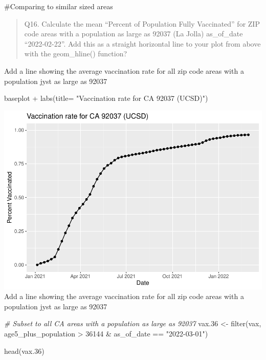 \documentclass[
]{article}
\newenvironment{Shaded}{\begin{snugshade}}{\end{snugshade}}
\newcommand{\AttributeTok}[1]{\textcolor[rgb]{0.77,0.63,0.00}{#1}}
\newcommand{\CommentTok}[1]{\textcolor[rgb]{0.56,0.35,0.01}{\textit{#1}}}
\newcommand{\DecValTok}[1]{\textcolor[rgb]{0.00,0.00,0.81}{#1}}
\newcommand{\FloatTok}[1]{\textcolor[rgb]{0.00,0.00,0.81}{#1}}
\newcommand{\FunctionTok}[1]{\textcolor[rgb]{0.00,0.00,0.00}{#1}}
\newcommand{\NormalTok}[1]{#1}
\newcommand{\OtherTok}[1]{\textcolor[rgb]{0.56,0.35,0.01}{#1}}
\newcommand{\SpecialCharTok}[1]{\textcolor[rgb]{0.00,0.00,0.00}{#1}}
\newcommand{\StringTok}[1]{\textcolor[rgb]{0.31,0.60,0.02}{#1}}
\begin{document}
\#Comparing to similar sized areas

\begin{quote}
Q16. Calculate the mean ``Percent of Population Fully Vaccinated'' for
ZIP code areas with a population as large as 92037 (La Jolla)
as\_of\_date ``2022-02-22''. Add this as a straight horizontal line to
your plot from above with the geom\_hline() function?
\end{quote}

Add a line showing the average vaccination rate for all zip code areas
with a population jyst as large as 92037

\begin{Shaded}
\begin{Highlighting}[]
\NormalTok{baseplot }\SpecialCharTok{+} \FunctionTok{labs}\NormalTok{(}\AttributeTok{title=} \StringTok{"Vaccination rate for CA 92037 (UCSD)"}\NormalTok{)}
\end{Highlighting}
\end{Shaded}

\includegraphics{COVID-19-Vax-mini-project_files/figure-latex/unnamed-chunk-30-1.pdf}
Add a line showing the average vaccination rate for all zip code areas
with a population jyst as large as 92037

\begin{Shaded}
\begin{Highlighting}[]
\CommentTok{\# Subset to all CA areas with a population as large as 92037}
\NormalTok{vax}\FloatTok{.36} \OtherTok{\textless{}{-}} \FunctionTok{filter}\NormalTok{(vax, age5\_plus\_population }\SpecialCharTok{\textgreater{}} \DecValTok{36144} \SpecialCharTok{\&}
\NormalTok{                as\_of\_date }\SpecialCharTok{==} \StringTok{"2022{-}03{-}01"}\NormalTok{)}

\FunctionTok{head}\NormalTok{(vax}\FloatTok{.36}\NormalTok{)}
\end{Highlighting}
\end{Shaded}
\end{document}
